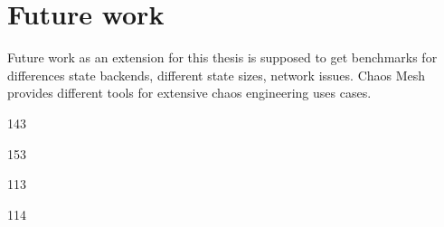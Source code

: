 \section{Future work}\label{sec:future-work}
Future work as an extension for this thesis is supposed to get benchmarks
for differences state backends, different state sizes, network issues.
Chaos Mesh \cite{chaosMesh} provides different tools for extensive chaos engineering
uses cases.


143

153


113

114